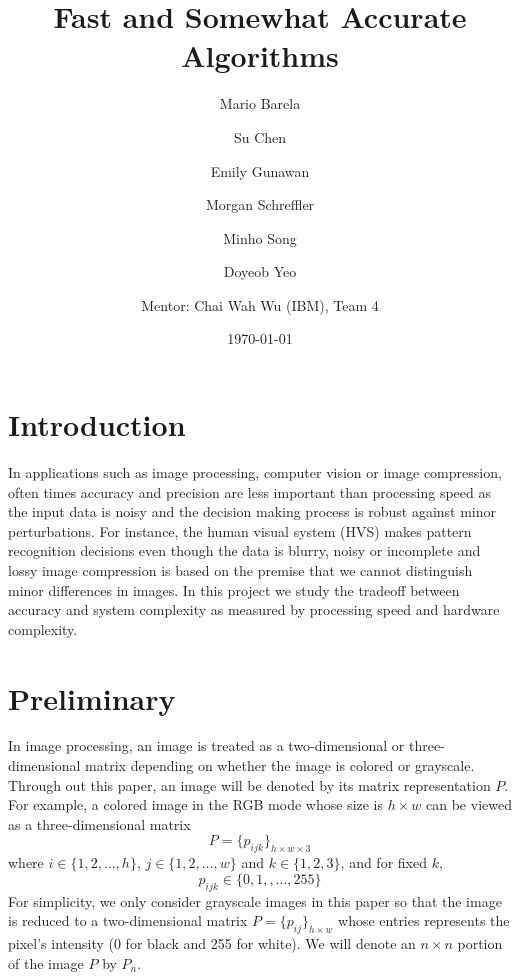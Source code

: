\documentclass[12pt]{amsart}
\theoremstyle{definition}
\theoremstyle{remark}
\numberwithin{thm}{section}
\begin{document}
\title{Fast and Somewhat Accurate Algorithms}

\author[Barela]{Mario Barela}
\author[Chen]{Su Chen}
\author[Gunawan]{Emily Gunawan}
\author[Schreffler]{Morgan Schreffler}
\author[Song]{Minho Song}
\author[Yeo]{Doyeob Yeo}
\author[Wu]{Mentor: Chai Wah Wu (IBM), Team 4}

\address{Mathematical Modeling in Industry XIX (August 5-14, 2015)}

\date{\today}
\maketitle

\section{Introduction}%
In applications such as image processing, computer vision or image compression, often times accuracy and precision are less important than processing speed as the input data is noisy and the decision making process is robust against minor perturbations. For instance, the human visual system (HVS) makes pattern recognition decisions even though the data is blurry, noisy or incomplete and lossy image compression is based on the premise that we cannot distinguish minor differences in images. In this project we study the tradeoff between accuracy and system complexity as measured by processing speed and hardware complexity.

\section{Preliminary}
In image processing, an image is treated as a two-dimensional or three-dimensional matrix depending on whether the image is colored or grayscale. Through out this paper, an image will be denoted by its matrix representation $P$. For example, a colored image in the RGB mode whose size is $h\times w$ can be viewed as a three-dimensional matrix 
\[P=\{p_{ijk}\}_{h\times w\times 3}\] 
where  $i\in\{1,2,\dots,h\}$, $j\in\{1,2,\dots,w\}$ and $k\in\{1,2,3\}$, and for fixed $k$,
\[p_{ijk}\in\{0,1,,\dots,255\}\]
For simplicity, we only consider grayscale images in this paper so that the image is reduced to a two-dimensional matrix $P=\{p_{ij}\}_{h\times w}$ whose entries represents the pixel's intensity (0 for black and 255 for white). We will denote an $n\times n$ portion of the image $P$ by $P_n$. 
\end{document}
